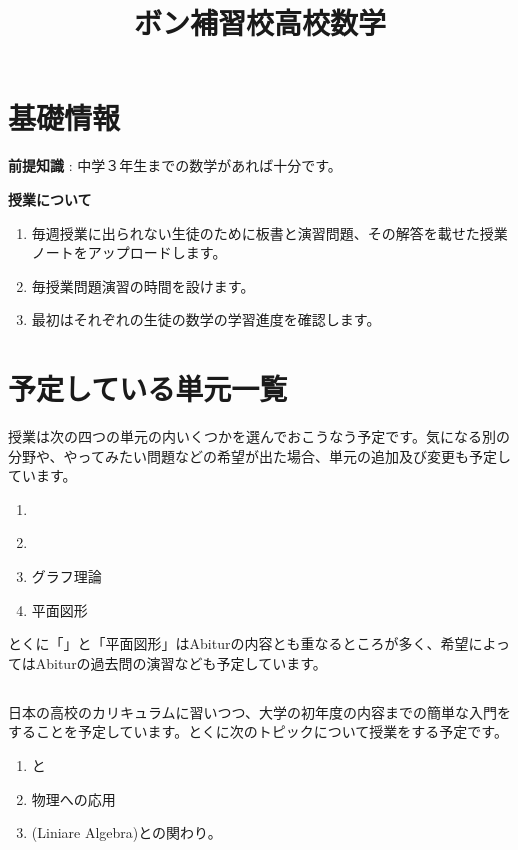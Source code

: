 \documentclass{ltjsarticle}
\title{ボン補習校高校数学}
\author{}
\date{}
\begin{document}
\maketitle

\section{基礎情報}

\par\textbf{前提知識} : 中学３年生までの数学があれば十分です。
\par\textbf{授業について} 
\begin{enumerate}[	$\bullet$]
\item 毎週授業に出られない生徒のために板書と演習問題、その解答を載せた授業ノートをアップロードします。
\item 毎授業問題演習の時間を設けます。
\item 最初はそれぞれの生徒の数学の学習進度を確認します。
\end{enumerate}

\section{予定している単元一覧}

授業は次の四つの単元の内いくつかを選んでおこうなう予定です。気になる別の分野や、やってみたい問題などの希望が出た場合、単元の追加及び変更も予定しています。
\begin{enumerate}
\item {}
\item 
\item グラフ理論
\item 平面図形
\end{enumerate}

とくに「」と「平面図形」はAbiturの内容とも重なるところが多く、希望によってはAbiturの過去問の演習なども予定しています。

\subsection{}

日本の高校のカリキュラムに習いつつ、大学の初年度の内容までの簡単な入門をすることを予定しています。とくに次のトピックについて授業をする予定です。
\begin{enumerate}[$\bullet$]
\item {}と
\item 物理への応用
\item {}(Liniare Algebra)との関わり。
\end{enumerate}
\end{document}
